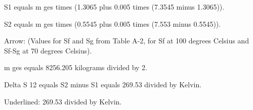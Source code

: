 S1 equals m ges times (1.3065 plus 0.005 times (7.3545 minus 1.3065)).  

S2 equals m ges times (0.5545 plus 0.005 times (7.553 minus 0.5545)).  

Arrow: (Values for Sf and Sg from Table A-2, for Sf at 100 degrees Celsius and Sf-Sg at 70 degrees Celsius).  

m ges equals 8256.205 kilograms divided by 2.  

Delta S 12 equals S2 minus S1 equals 269.53 divided by Kelvin.  

Underlined: 269.53 divided by Kelvin.